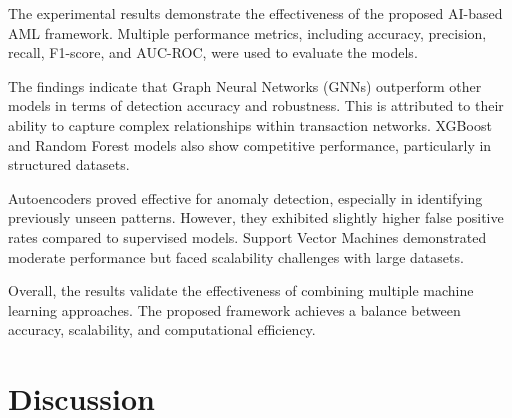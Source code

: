 \documentclass[twoside,twocolumn,10pt]{article}
\begin{document}
The experimental results demonstrate the effectiveness of the proposed AI-based AML framework. Multiple performance metrics, including accuracy, precision, recall, F1-score, and AUC-ROC, were used to evaluate the models.

The findings indicate that Graph Neural Networks (GNNs) outperform other models in terms of detection accuracy and robustness. This is attributed to their ability to capture complex relationships within transaction networks. XGBoost and Random Forest models also show competitive performance, particularly in structured datasets.

Autoencoders proved effective for anomaly detection, especially in identifying previously unseen patterns. However, they exhibited slightly higher false positive rates compared to supervised models. Support Vector Machines demonstrated moderate performance but faced scalability challenges with large datasets.

Overall, the results validate the effectiveness of combining multiple machine learning approaches. The proposed framework achieves a balance between accuracy, scalability, and computational efficiency.

\begin{table}[t]
\centering
\caption{General Caption for Table 3}
\label{table3}
\renewcommand{\arraystretch}{1.2}
\setlength{\tabcolsep}{6pt}
\end{table}


\section{Discussion}
\fontsize{11}{13}\selectfont
\end{document}
